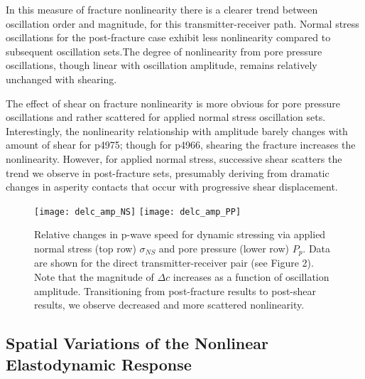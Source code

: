 \documentclass[draft]{agujournal2019}
\begin{document}
In this measure of fracture nonlinearity there is a clearer trend between oscillation order and magnitude, for this transmitter-receiver path. Normal stress oscillations for the post-fracture case exhibit less nonlinearity compared to  subsequent oscillation sets.The degree of nonlinearity from pore pressure oscillations, though linear with oscillation amplitude, remains relatively unchanged with shearing. 

The effect of shear on fracture nonlinearity is more obvious for pore pressure oscillations and rather scattered for applied normal stress oscillation sets. Interestingly, the nonlinearity relationship with amplitude barely changes with amount of shear for p4975; though for p4966,  shearing the fracture increases the nonlinearity. However, for applied normal stress, successive shear scatters the trend we observe in post-fracture sets, presumably deriving from dramatic changes in asperity contacts that occur with progressive shear displacement.

\clearpage

\begin{figure}[ht]
	\centering
	\texttt{[image: delc\_amp\_NS]}
	\texttt{[image: delc\_amp\_PP]}
	\caption{ Relative changes in p-wave speed for dynamic stressing via applied normal stress (top row)  $ \sigma_{NS} $ and pore pressure (lower row) $ P_p $. Data are shown for the direct transmitter-receiver pair (see Figure 2). Note that the magnitude of $ \Delta c $  increases as a function of oscillation amplitude. Transitioning from post-fracture results to post-shear results, we observe decreased and more scattered nonlinearity.}%
	\label{fig:delc_ns_amp}
\end{figure}

\clearpage


\subsection{Spatial Variations of the Nonlinear Elastodynamic Response}
\end{document}
